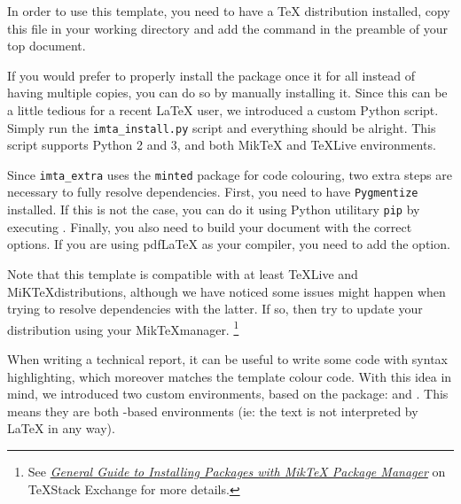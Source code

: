 \documentclass{report}
\begin{document}
In order to use this template, you need to have a \TeX{} distribution installed, copy this file in your working directory and add the  command in the preamble of your top document.

If you would prefer to properly install the package once it for all instead of having multiple copies, you can do so by manually installing it. 
Since this can be a little tedious for a recent \LaTeX{} user, we introduced a custom Python script. 
Simply run the \texttt{imta\_install.py} script and everything should be alright.
This script supports Python 2 and 3, and both Mik\TeX{} and \TeX{}Live environments. 

Since \texttt{imta\_extra} uses the \texttt{minted} package for code colouring, two extra steps are necessary to fully resolve dependencies. 
First, you need to have \texttt{Pygmentize} installed. 
If this is not the case, you can do it using Python utilitary \texttt{pip} by executing . 
Finally, you also need to build your document with the correct options. 
If you are using pdf\LaTeX{} as your compiler, you need to add the  option.

Note that this template is compatible with at least \TeX Live and MiK\TeX distributions, although we have noticed some issues might happen when trying to resolve dependencies with the latter. If so, then try to update your distribution using your Mik\TeX manager.
\footnote{See \textit{\href{https://tex.stackexchange.com/a/359851}{General Guide to Installing Packages with MikTeX Package Manager}} on \TeX Stack Exchange for more details.}



When writing a technical report, it can be useful to write some code with syntax highlighting, which moreover matches the template colour code.
 With this idea in mind, we introduced two custom environments, based on the  package:  and . 
 This means they are both -based environments (ie: the text is not interpreted by \LaTeX{} in any way).
\end{document}
